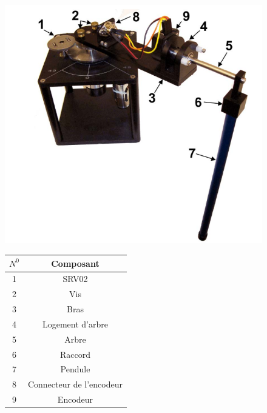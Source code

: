 \documentclass[12pt, a4paper, openany]{report}
\begin{document}
\begin{figure}
\centering
\begin{minipage}{.5\textwidth}
  \centering
  \includegraphics[scale=0.25]{pondule.png}
  \label{fig1}
\end{minipage}%
\begin{minipage}{.5\textwidth}
	\begin{center}
		\begin{tabular}{|c|c|}
		\hline \rowcolor{rougecerise} $N^{0}$ & Composant\\
		\hline 1 & SRV02\\
		\hline 2 & Vis\\
		\hline 3 & Bras\\
		\hline 4 & Logement d’arbre\\
		\hline 5 & Arbre\\
		\hline 6 & Raccord\\
		\hline 7 & Pendule\\
		\hline 8 & Connecteur de l'encodeur\\
		\hline 9 & Encodeur\\
		\hline
		\end{tabular}
		\label{tab1}
	\end{center}
\end{minipage}
\end{figure}
\end{document}
